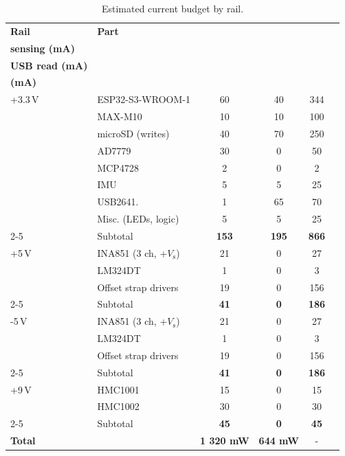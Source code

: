 \documentclass[11pt]{article}
\begin{document}
\begin{table}[htbp]
\centering
\caption{Estimated current budget by rail.}
\label{tab:power-budget}
\begin{tabular}{l l c c c c}
\toprule
\textbf{Rail} & \textbf{Part} & \shortstack{\textbf{Avg. current}\\\textbf{sensing (mA)}} 
& \shortstack{\textbf{Avg. current}\\\textbf{USB read (mA)}} & \shortstack{\textbf{Peak current}\\\textbf{(mA)}} \\
\midrule
+3.3\,V & ESP32-S3-WROOM-1              & 60   & 40  & 344 \\
        & MAX-M10                       & 10   & 10  & 100 \\
        & microSD (writes)              & 40   & 70  & 250 \\
        & AD7779                        & 30   &  0  &  50 \\
        & MCP4728                       &  2   &  0  &   2 \\
        & IMU                           &  5   &  5  &  25 \\
        & USB2641.                      &  1   & 65  &  70 \\
        & Misc. (LEDs, logic)           &  5   &  5   & 25 \\
\cmidrule(l){2-5}
        & Subtotal                      & \textbf{153}  & \textbf{195}  & \textbf{866} \\
\midrule
+5\,V   & INA851 (3 ch, +$V_\mathrm{s}$)& 21  & 0   &  27 \\
        & LM324DT                       & 1   & 0   &   3 \\
        & Offset strap drivers          & 19  & 0   & 156 \\
\cmidrule(l){2-5}
        & Subtotal                      & \textbf{41} & \textbf{0} & \textbf{186} \\
\midrule
-5\,V   & INA851 (3 ch, +$V_\mathrm{s}$)& 21  & 0   &  27 \\
        & LM324DT                       & 1   & 0   &   3 \\
        & Offset strap drivers          & 19  & 0   & 156 \\
\cmidrule(l){2-5}
        & Subtotal                      & \textbf{41} & \textbf{0} & \textbf{186} \\
\midrule
+9\,V   & HMC1001                       & 15  & 0 & 15 \\
        & HMC1002                       & 30  & 0 & 30 \\
\cmidrule(l){2-5}
        & Subtotal                      & \textbf{45}  & \textbf{0} & \textbf{45} \\
\addlinespace
\midrule
\textbf{Total}  &  & \textbf{1 320 mW} & \textbf{644 mW} & - \\
\bottomrule
\end{tabular}
\vspace{2mm}
\end{table}
\end{document}
